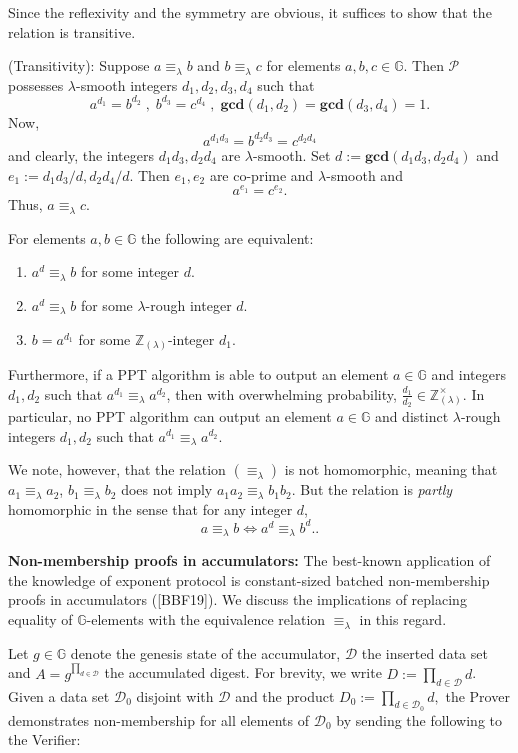 \documentclass[11pt, lettersize, notitlepage, leqno, footskip=0.6cm]{article}
\newcommand{\bz}{\mathbb Z}
\newcommand{\pl}{\prod\limits}
\newcommand{\LRA}{\Longleftrightarrow}
\newcommand{\eqlam}{\equiv_{\lam}}
\newcommand{\mc}{\mathcal}
\newcommand{\mb}{\mathbb}
\newcommand{\mbf}{\mathbf}
\newcommand{\lam}{\lambda}
\newcommand{\bzlam}{\bz_{(\lam)}}
\newcommand{\vs}{\vspace{-0.15cm}}
\newcommand{\noin}{\noindent}
\newcommand{\op}{overwhelming probability}
\newcommand{\GCD}{\mbf{gcd}}
\numberwithin{equation}{section}
\begin{document}
\begin{prf} Since the reflexivity and the symmetry are obvious, it suffices to show that the relation is transitive.

\noindent (Transitivity): Suppose $a \equiv_{\lam} b$ and $b \equiv_{\lam} c$ for elements $a, b, c\in\mb{G}$. Then $\mc{P}$ possesses $\lam$-smooth integers $d_1,d_2, d_3, d_4$ such that \vs $$a^{d_1} = b^{d_2}\;,\; b^{d_3} = c^{d_4}\;,\;\GCD(d_1,d_2) = \GCD(d_3,d_4) = 1.$$ Now, \vs $$a^{d_1d_3} = b^{d_2d_3} = c^{d_2 d_4}$$ and clearly, the integers $d_1d_3, d_2 d_4$ are $\lam$-smooth. Set $d:= \GCD(d_1d_3, d_2 d_4)$ and $e_1:= d_1d_3/d, d_2 d_4/d$. Then $e_1,e_2$ are co-prime and $\lam$-smooth and \vs $$ a^{e_1} = c^{e_2} .$$ Thus, $a \equiv_{\lam} c$.\end{prf}

For elements $a,b\in\mb{G}$ the following are equivalent:\begin{enumerate}[wide, labelwidth=!, labelindent=0pt] \vs

\item $a^d\eqlam b$ for some integer $d$.\vs
\item $a^d\eqlam b$ for some $\lam$-rough integer $d$.\vs
\item $b = a^{d_1}$ for some $\bzlam$-integer $d_1$.\end{enumerate}

Furthermore, if a PPT algorithm is able to output an element $a\in\mb{G}$ and integers $d_1,d_2$ such that $a^{d_1}\eqlam a^{d_2}$, then with \op, $\frac{d_1}{d_2}\in\bzlam^{\times}$. In particular, no PPT algorithm can output an element $a\in \mb{G}$ and distinct $\lam$-rough integers $d_1,d_2$ such that $a^{d_1}\eqlam a^{d_2}$.

We note, however, that the relation $(\equiv_{\lam})$ is not homomorphic, meaning that $a_1 \equiv_{\lam} a_2$, $b_1 \equiv_{\lam} b_2$ does not imply $a_1a_2 \eqlam b_1b_2$. But the relation is \textit{partly} homomorphic in the sense that for any integer $d$, \vs $$ a \equiv_{\lam} b \LRA a^d \equiv_{\lam} b^d ..$$ 


\noin \textbf{Non-membership proofs in accumulators:} The  best-known application of the knowledge of exponent protocol is constant-sized batched non-membership proofs in accumulators ([BBF19]). We discuss the implications of replacing equality of $\mb{G}$-elements with the equivalence relation $\eqlam$ in this regard. 

Let $g \in \mb{G}$ denote the genesis state of the accumulator, $\mc{D}$ the inserted data set and $A = g^{\pl_{d\in \mc{D}}}$ the accumulated digest. For brevity, we write $D:= \pl_{d\in \mc{D}} d$. Given a data set $\mc{D}_0$ disjoint with $\mc{D}$ and the product $D_0:= \pl_{d\in \mc{D}_0} d,$ the Prover demonstrates non-membership for all elements of $\mc{D}_0$ by sending the following to the Verifier:
\end{document}
